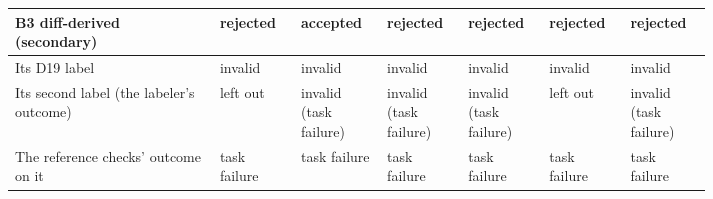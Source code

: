 \begin{table}[t]
\begin{tabular}{p{0.25\linewidth}p{0.093\linewidth}p{0.093\linewidth}p{0.093\linewidth}p{0.093\linewidth}p{0.093\linewidth}p{0.093\linewidth}}
\raggedright\hspace{0pt}B3 diff-derived (secondary) & \raggedright\hspace{0pt}rejected & \raggedright\hspace{0pt}accepted & \raggedright\hspace{0pt}rejected & \raggedright\hspace{0pt}rejected & \raggedright\hspace{0pt}rejected & \raggedright\hspace{0pt}rejected \tabularnewline\midrule
\raggedright\hspace{0pt}Its D19 label & \raggedright\hspace{0pt}invalid & \raggedright\hspace{0pt}invalid & \raggedright\hspace{0pt}invalid & \raggedright\hspace{0pt}invalid & \raggedright\hspace{0pt}invalid & \raggedright\hspace{0pt}invalid \tabularnewline
\raggedright\hspace{0pt}Its second label (the labeler's outcome) & \raggedright\hspace{0pt}left out & \raggedright\hspace{0pt}invalid (task failure) & \raggedright\hspace{0pt}invalid (task failure) & \raggedright\hspace{0pt}invalid (task failure) & \raggedright\hspace{0pt}left out & \raggedright\hspace{0pt}invalid (task failure) \tabularnewline
\raggedright\hspace{0pt}The reference checks' outcome on it & \raggedright\hspace{0pt}task failure & \raggedright\hspace{0pt}task failure & \raggedright\hspace{0pt}task failure & \raggedright\hspace{0pt}task failure & \raggedright\hspace{0pt}task failure & \raggedright\hspace{0pt}task failure \tabularnewline
\bottomrule\end{tabular}\end{table}

